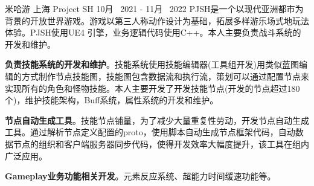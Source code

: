 


\begin{cventries}
	
\cventrycompany
{米哈游} %
{上海} %
\cventryproject
{Project SH} %
{10月~ 2021 - 11月~ 2022} %
{PJSH是一个以现代亚洲都市为背景的开放世界游戏。游戏以第三人称动作设计为基础，拓展多样游乐场式地玩法体验。PJSH使用UE4 引擎，业务逻辑代码使用C++。本人主要负责战斗系统的开发和维护。}
{ %
	\begin{cvitems}
		\item {\textbf{负责技能系统的开发和维护}。技能系统使用技能编辑器(工具组开发)用类似蓝图编辑的方式制作节点技能图，技能图包含数据流和执行流，策划可以通过配置节点来实现所有的角色和怪物技能。本人主要开发了开发技能节点(开发的节点超过180个)，维护技能架构，Buff系统，属性系统的开发和维护。 }
		\item{\textbf{节点自动生成工具}。技能节点铺量，为了减少大量重复性劳动，开发节点自动生成工具。通过解析节点定义配置的proto，使用脚本自动生成节点框架代码，自动数据节点的组织和客户端服务器同步代码，使得开发效率大幅度提升，该工具在组内广泛应用。}
		\item{\textbf{Gameplay业务功能相关开发}。元素反应系统、超能力时间缓速功能等。}
	\end{cvitems}
}



\end{cventries}
